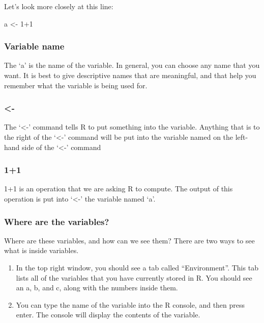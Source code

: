 \documentclass[]{book}
\newenvironment{Shaded}{\begin{snugshade}}{\end{snugshade}}
\newcommand{\DecValTok}[1]{\textcolor[rgb]{0.00,0.00,0.81}{{#1}}}
\newcommand{\StringTok}[1]{\textcolor[rgb]{0.31,0.60,0.02}{{#1}}}
\newcommand{\NormalTok}[1]{{#1}}
\providecommand{\tightlist}{%
  \setlength{\itemsep}{0pt}\setlength{\parskip}{0pt}}
\theoremstyle{definition}
\theoremstyle{definition}
\theoremstyle{definition}
\theoremstyle{remark}
\begin{document}
Let's look more closely at this line:

\begin{Shaded}
\begin{Highlighting}[]
\NormalTok{a <-}\StringTok{ }\DecValTok{1+1}
\end{Highlighting}
\end{Shaded}

\subsubsection{Variable name}\label{variable-name}

The `a' is the name of the variable. In general, you can choose any name
that you want. It is best to give descriptive names that are meaningful,
and that help you remember what the variable is being used for.

\subsubsection{\textless{}-}\label{section}

The `\textless{}-' command tells R to put something into the variable.
Anything that is to the right of the `\textless{}-' command will be put
into the variable named on the left-hand side of the `\textless{}-'
command

\subsubsection{1+1}\label{section-1}

1+1 is an operation that we are asking R to compute. The output of this
operation is put into `\textless{}-' the variable named `a'.

\subsubsection{Where are the variables?}\label{where-are-the-variables}

Where are these variables, and how can we see them? There are two ways
to see what is inside variables.

\begin{enumerate}
\def\labelenumi{\arabic{enumi}.}
\tightlist
\item
  In the top right window, you should see a tab called ``Environment''.
  This tab lists all of the variables that you have currently stored in
  R. You should see an a, b, and c, along with the numbers inside them.
\item
  You can type the name of the variable into the R console, and then
  press enter. The console will display the contents of the variable.
\end{enumerate}
\end{document}
